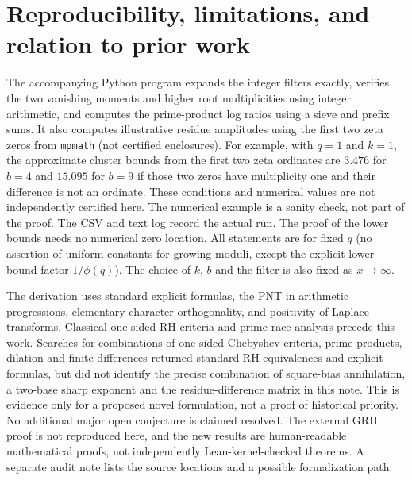 \documentclass[11pt]{article}
\theoremstyle{definition}\newtheorem{definition}[theorem]{Definition}
\begin{document}
\section{Reproducibility, limitations, and relation to prior work}
The accompanying Python program expands the integer filters exactly, verifies the two vanishing moments and higher root multiplicities using integer arithmetic, and computes the prime-product log ratios using a sieve and prefix sums. It also computes illustrative residue amplitudes using the first two zeta zeros from \texttt{mpmath} (not certified enclosures). For example, with $q=1$ and $k=1$, the approximate cluster bounds from the first two zeta ordinates are $3.476$ for $b=4$ and $15.095$ for $b=9$ if those two zeros have multiplicity one and their difference is not an ordinate. These conditions and numerical values are not independently certified here. The numerical example is a sanity check, not part of the proof. The CSV and text log record the actual run. The proof of the lower bounds needs no numerical zero location. All statements are for fixed $q$ (no assertion of uniform constants for growing moduli, except the explicit lower-bound factor $1/\phi(q)$). The choice of $k$, $b$ and the filter is also fixed as $x\to\infty$.

The derivation uses standard explicit formulas, the PNT in arithmetic progressions, elementary character orthogonality, and positivity of Laplace transforms. Classical one-sided RH criteria and prime-race analysis precede this work. Searches for combinations of one-sided Chebyshev criteria, prime products, dilation and finite differences returned standard RH equivalences and explicit formulas, but did not identify the precise combination of square-bias annihilation, a two-base sharp exponent and the residue-difference matrix in this note. This is evidence only for a proposed novel formulation, not a proof of historical priority. No additional major open conjecture is claimed resolved. The external GRH proof is not reproduced here, and the new results are human-readable mathematical proofs, not independently Lean-kernel-checked theorems. A separate audit note lists the source locations and a possible formalization path.
\end{document}
